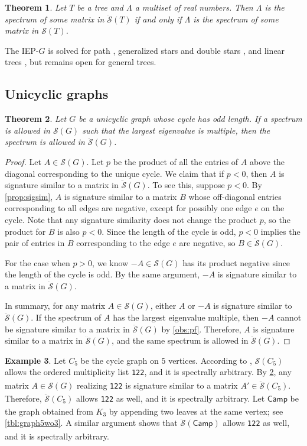\documentclass{article}
\newtheorem{theorem}{Theorem}[section]
\theoremstyle{definition}
\newtheorem{example}[theorem]{Example}
\newcommand{\mptn}{\mathcal{S}}
\newcommand{\mdso}{\ddot{\mathcal{S}}}
\newcommand{\Camp}{\mathsf{Camp}}
\newcommand{\mtt}[2][]{\texttt{#2}\textsubscript{#1}}
\begin{document}
\begin{theorem}
\label{thm:iepstree}
Let $T$ be a tree and $\Lambda$ a multiset of real numbers.  Then $\Lambda$ is the spectrum of some matrix in $\mdso(T)$ if and only if $\Lambda$ is the spectrum of some matrix in $\mptn(T)$.  
\end{theorem}

The IEP-$G$ is solved for path \cite{GW76,Hald76}, generalized stars and double stars \cite{JLDS03}, and linear trees \cite{JW22}, but remains open for general trees.

\subsection{Unicyclic graphs}

\begin{theorem}
\label{thm:unico}
Let $G$ be a unicyclic graph whose cycle has odd length.  If a spectrum is allowed in $\mptn(G)$ such that the largest eigenvalue is multiple, then the spectrum is allowed in $\mdso(G)$.  
\end{theorem}
\begin{proof}
Let $A\in\mptn(G)$.  Let $p$ be the product of all the entries of $A$ above the diagonal corresponding to the unique cycle.  We claim that if $p < 0$, then $A$ is signature similar to a matrix in $\mdso(G)$.  To see this, suppose $p < 0$.  By \cref{prop:sigsim}, $A$ is signature similar to a matrix $B$ whose off-diagonal entries corresponding to all edges are negative, except for possibly one edge $e$ on the cycle.  
Note that any signature similarity does not change the product $p$, so the product for $B$ is also $p < 0$.  Since the length of the cycle is odd, $p < 0$ implies the pair of entries in $B$ corresponding to the edge $e$ are negative, so $B\in\mdso(G)$.

For the case when $p > 0$, we know $-A\in\mptn(G)$ has its product negative since the length of the cycle is odd.  By the same argument, $-A$ is signature similar to a matrix in $\mdso(G)$.

In summary, for any matrix $A\in\mptn(G)$, either $A$ or $-A$ is signature similar to $\mdso(G)$.  If the spectrum of $A$ has the largest eigenvalue multiple, then $-A$ cannot be signature similar to a matrix in $\mdso(G)$ by \cref{obs:pf}.  Therefore, $A$ is signature similar to a matrix in $\mdso(G)$, and the same spectrum is allowed in $\mdso(G)$. 
\end{proof}

\begin{example}
\label{ex:unic5}
Let $C_5$ be the cycle graph on $5$ vertices.  According to \cite{IEPG2}, $\mptn(C_5)$ allows the ordered multiplicity list \mtt{122}, and it is spectrally arbitrary.  By \cref{thm:unico}, any matrix $A\in\mptn(G)$ realizing \mtt{122} is signature similar to a matrix $A'\in\mdso(C_5)$.  Therefore, $\mdso(C_5)$ allows \mtt{122} as well, and it is spectrally arbitrary.  Let $\Camp$ be the graph obtained from $K_3$ by appending two leaves at the same vertex; see \cref{tbl:graph5wo3}.  A similar argument shows that $\mdso(\Camp)$ allows \mtt{122} as well, and it is spectrally arbitrary.
\end{example}
\end{document}
